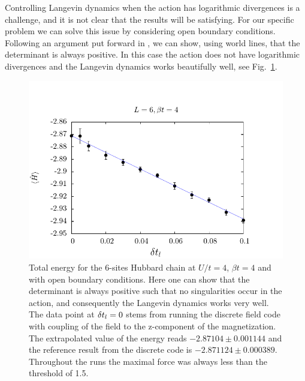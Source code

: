Controlling Langevin dynamics when the action has logarithmic divergences is a challenge, and it is not clear  that the results will be satisfying.  For our specific problem we can solve this issue by considering open boundary conditions. Following an argument put forward in \cite{Assaad07}, we can show, using world lines, that the determinant is always positive.   In this case the  action does not  have logarithmic divergences and the Langevin dynamics works beautifully well, see Fig.~\ref{Langevin.fig}. 

\begin{figure}[H]
        \begin{center}
                \includegraphics[scale=0.9]{Figures/Langevin.pdf}
            \end{center}
        \caption{\label{Langevin.fig}   Total energy for the 6-sites Hubbard chain at $U/t=4$, $\beta t = 4$ and with open boundary conditions.   Here one can show that the determinant is always positive such that  no   singularities occur in the action, and consequently the Langevin dynamics works very well.  The data point at $\delta t_{l} =0$ stems from running the  discrete  field code with coupling  of the field to the z-component of the magnetization.  The extrapolated value of the energy reads  $-2.87104   \pm 0.001144$ and the reference result from the discrete code is $  -2.871124   \pm  0.000389 $.  Throughout the runs the maximal force was always less than the threshold of 1.5.   }
\end{figure}
